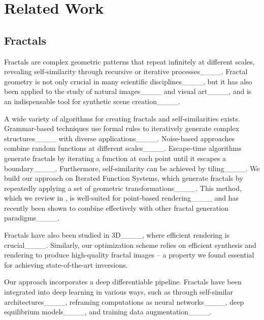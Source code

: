 \section{Related Work}
\label{sec:related_work}


\subsection{Fractals}
\label{sec:fractals}

Fractals are complex geometric patterns that repeat infinitely at different scales, revealing self-similarity through recursive or iterative processes____.
Fractal geometry is not only crucial in many scientific disciplines____, but it has also been applied to the study of natural images____ and visual art____, and is an indispensable tool for synthetic scene creation____.

A wide variety of algorithms for creating fractals and self-similarities exists. 
Grammar-based techniques use formal rules to iteratively generate complex structures____ with diverse applications____.
Noise-based approaches combine random functions at different scales____.
Escape-time algorithms generate fractals by iterating a function at each point until it escapes a boundary____.
Furthermore, self-similarity can be achieved by tiling____.
We build our approach on Iterated Function Systems, which generate fractals by repeatedly applying a set of geometric transformations____.
This method, which we review in , is well-suited for point-based rendering____ and has recently been shown to combine effectively with other fractal generation paradigms____.

Fractals have also been studied in 3D____, where efficient rendering is crucial____. 
Similarly, our optimization scheme relies on efficient synthesis and rendering to produce high-quality fractal images -- a property we found essential for achieving state-of-the-art inversions.

Our approach incorporates a deep differentiable pipeline. 
Fractals have been integrated into deep learning in various ways, such as through self-similar architectures____, reframing computations as neural networks____, deep equilibrium models____, and training data augmentation____.


